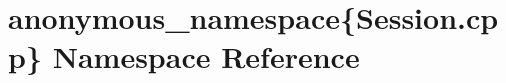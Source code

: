 \hypertarget{namespaceanonymous__namespace_02Session_8cpp_03}{\section{anonymous\-\_\-namespace\{Session.\-cpp\} Namespace Reference}
\label{namespaceanonymous__namespace_02Session_8cpp_03}
}
